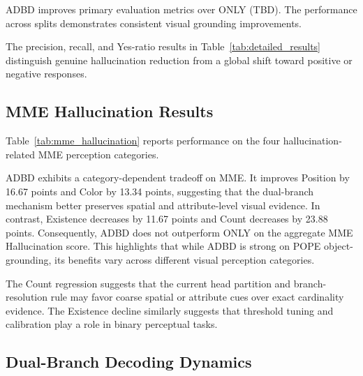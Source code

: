 ADBD improves primary evaluation metrics over ONLY (TBD). The performance across splits demonstrates consistent visual grounding improvements.

The precision, recall, and Yes-ratio results in Table~\ref{tab:detailed_results} distinguish genuine hallucination reduction from a global shift toward positive or negative responses.

\subsection{MME Hallucination Results}

Table~\ref{tab:mme_hallucination} reports performance on the four hallucination-related MME perception categories.

\begin{table}[t]
\centering
\small
\setlength{\tabcolsep}{3pt}
\caption{MME Hallucination results. Higher is better.}
\label{tab:mme_hallucination}
\end{table}

ADBD exhibits a category-dependent tradeoff on MME. It improves Position by 16.67 points and Color by 13.34 points, suggesting that the dual-branch mechanism better preserves spatial and attribute-level visual evidence. In contrast, Existence decreases by 11.67 points and Count decreases by 23.88 points. Consequently, ADBD does not outperform ONLY on the aggregate MME Hallucination score. This highlights that while ADBD is strong on POPE object-grounding, its benefits vary across different visual perception categories.

The Count regression suggests that the current head partition and branch-resolution rule may favor coarse spatial or attribute cues over exact cardinality evidence. The Existence decline similarly suggests that threshold tuning and calibration play a role in binary perceptual tasks.

\subsection{Dual-Branch Decoding Dynamics}

